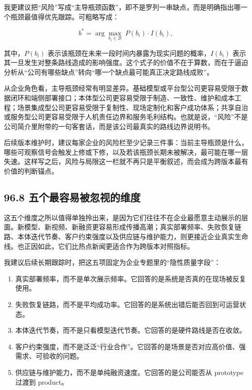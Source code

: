 我更建议把“风险”写成“主导瓶颈函数”，即不是罗列一串缺点，而是明确指出哪一个瓶颈最值得优先跟踪。可粗略写成：

\begingroup
\footnotesize
\begin{equation*}
b^{*} = \arg\max_{b_i \in \mathcal{B}} \; P(b_i)\cdot I(b_i),
\end{equation*}
\endgroup

其中，\(P(b_i)\) 表示该瓶颈在未来一段时间内暴露为现实问题的概率，\(I(b_i)\) 表示其一旦发生对整条路线造成的影响强度。这个式子的价值不在于算数，而在于逼迫分析从“公司有哪些缺点”转向“哪一个缺点最可能真正决定路线成败”。

从企业角色看，主导瓶颈经常有明显差异。基础模型或平台型公司更容易受限于数据闭环和端侧部署接口；本体型公司更容易受限于制造、一致性、维护和成本工程；场景集成型公司更容易受限于复制性、现场定制化和客户成功体系；共享自治或服务型公司更容易受限于人机责任边界和服务毛利结构。也就是说，“风险”不是公司简介里附带的一句客套话，而是该公司最真实的路线边界说明书。

后续版本维护时，建议每家企业的风险栏至少记录三件事：当前主导瓶颈是什么，哪些可观察信号会触发上修或下修，以及若该瓶颈长期未被解决，最可能在哪一层失速。这样写之后，风险与局限这一栏就不再只是平衡叙述，而会成为跨版本最有价值的判断锚点。

\subsection*{96.8 五个最容易被忽视的维度}


这五个维度之所以值得单独拎出来，是因为它们往往不在企业最愿意主动展示的层面。新模型、新视频、新融资更容易形成传播高潮；真实部署频率、失败恢复链路、本体迭代节奏、客户约束强度以及供应链与维护能力，则更接近企业真实生命线。也正因如此，它们比热点新闻更适合作为跨版本对照指标。

我建议后续长期跟踪时，把这五项固定为企业专题里的“隐性质量字段”：

\begin{enumerate}
\item 真实部署频率，而不是单次展示频率。它回答的是系统是否真的在现场被反复使用。
\item 失败恢复链路，而不是平均成功率。它回答的是系统出错后能否回到可运营状态。
\item 本体迭代节奏，而不是只看模型迭代节奏。它回答的是硬件路线是否在收敛。
\item 客户约束强度，而不是泛泛“行业合作”。它回答的是场景是否对应高价值、强需求、可验收的问题。
\item 供应链与维护能力，而不是单纯融资速度。它回答的是公司能否从 prototype 过渡到 product。
\end{enumerate}

